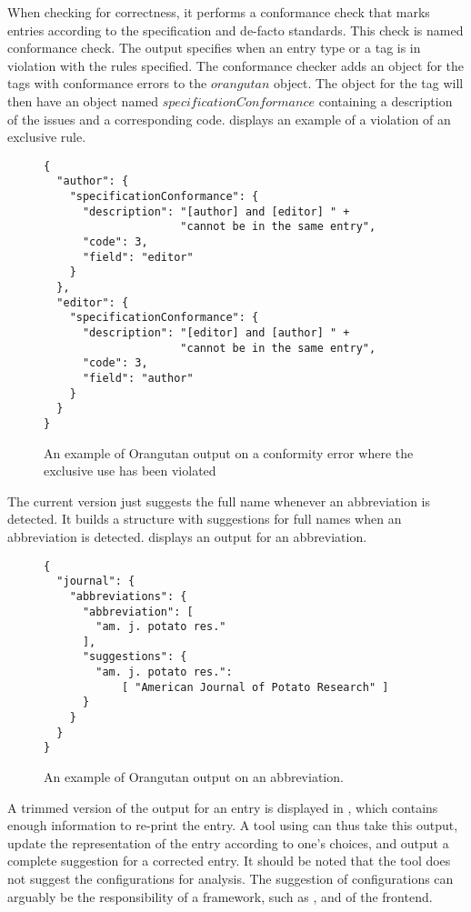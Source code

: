 When checking for correctness, it performs a conformance check that
marks entries according to the {\bibtex} specification and de-facto
standards.  This check is named conformance check.  The output
specifies when an entry type or a tag is in violation with the rules
specified.  The conformance checker adds an object for the tags with
conformance errors to the $orangutan$ object.  The object for the tag
will then have an object named $specificationConformance$ containing a
description of the issues and a corresponding code.
 displays an example of a violation
of an exclusive rule.

\begin{figure}
  \centering
\begin{verbatim}
{
  "author": {
    "specificationConformance": {
      "description": "[author] and [editor] " +
                     "cannot be in the same entry",
      "code": 3,
      "field": "editor"
    }
  },
  "editor": {
    "specificationConformance": {
      "description": "[editor] and [author] " +
                     "cannot be in the same entry",
      "code": 3,
      "field": "author"
    }
  }
}
\end{verbatim}
\caption{An example of Orangutan output on a conformity error where
  the exclusive use has been violated}
\label{fig:orgazing_nonconformity}
\end{figure}

The current version just suggests the full name whenever an
abbreviation is detected.  It builds a structure with suggestions for
full names when an abbreviation is
detected.  displays an {\orangutan}
output for an abbreviation.

\begin{figure}
  \centering
\begin{verbatim}
{
  "journal": {
    "abbreviations": {
      "abbreviation": [
        "am. j. potato res."
      ],
      "suggestions": {
        "am. j. potato res.":
            [ "American Journal of Potato Research" ]
      }
    }
  }
}
\end{verbatim}
\caption{An example of Orangutan output on an abbreviation.}
\label{fig:orgazing_abbreviation}
\end{figure}

A trimmed version of the output for an entry is displayed in
, which contains enough information to
re-print the entry.  A tool using {\orangutan} can thus take this
output, update the representation of the entry according to one's
choices, and output a complete suggestion for a corrected entry.  It
should be noted that the tool does not suggest the configurations for
analysis.  The suggestion of configurations can arguably be the
responsibility of a framework, such as {\orangutan}, and of the
frontend.


